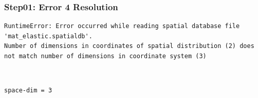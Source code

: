 \documentclass{beamer}
\begin{document}
\begin{frame}[fragile]
  \frametitle{Step01: Error 4 Resolution}

\begin{lstlisting}
RuntimeError: Error occurred while reading spatial database file 'mat_elastic.spatialdb'.
Number of dimensions in coordinates of spatial distribution (2) does
not match number of dimensions in coordinate system (3)
\end{lstlisting}\pause
{} \pause\\
\begin{lstlisting}
space-dim = 3
\end{lstlisting}

\end{frame}
\end{document}
